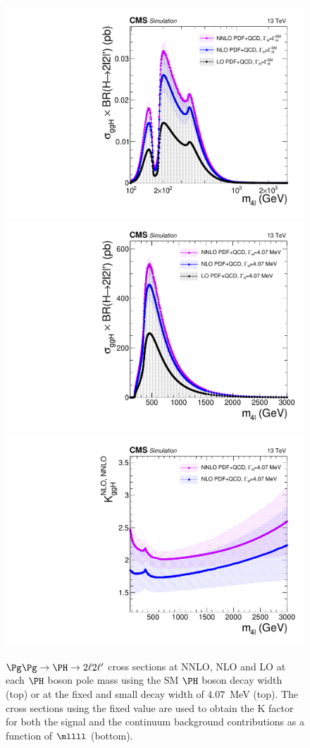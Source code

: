 \begin{figure}[!htb]
\centering
\includegraphics[width=0.48\linewidth]{Figures/IrrBkg/cCompare_hnnlo_ggHZZ2l2l_xsec.pdf}
\includegraphics[width=0.48\linewidth]{Figures/IrrBkg/cCompare_hnnlo_ggHZZ2l2l_narrowwidth_xsec.pdf}\\
\includegraphics[width=0.48\linewidth]{Figures/IrrBkg/cCompare_hnnlo_ggHZZ2l2l_narrowwidth_kfactor.pdf}
\caption{$\Pg\Pg\to\PH\to2\ell2\ell^\prime$ cross sections at NNLO, NLO and LO at each $\PH$ boson pole mass using the SM $\PH$ boson decay width  (top) or at the fixed and small decay width of $4.07$~MeV (top). The cross sections using the fixed value are used to obtain the K factor for both the signal and the continuum background contributions as a function of $\mllll$ (bottom).
}
\label{fig:ggHZZXsecKfactor}
\end{figure}


